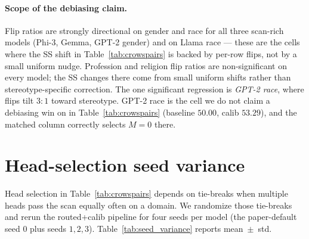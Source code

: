 \paragraph{Scope of the debiasing claim.} Flip ratios are strongly
directional on gender and race for all three scan-rich models
(Phi-3, Gemma, GPT-2 gender) and on Llama race --- these are the
cells where the SS shift in Table~\ref{tab:crowspairs} is backed by
per-row flips, not by a small uniform nudge. Profession and religion
flip ratios are non-significant on every model; the SS changes there
come from small uniform shifts rather than stereotype-specific
correction. The one significant regression is \emph{GPT-2 race},
where flips tilt $3{:}1$ toward stereotype. GPT-2 race is the cell we
do not claim a debiasing win on in Table~\ref{tab:crowspairs} (baseline
$50.00$, calib $53.29$), and the matched column correctly selects
$M{=}0$ there.

\section{Head-selection seed variance}
\label{app:seed_variance}

Head selection in Table~\ref{tab:crowspairs} depends on tie-breaks
when multiple heads pass the scan equally often on a domain. We
randomize those tie-breaks and rerun the routed+calib pipeline for
four seeds per model (the paper-default seed $0$ plus seeds $1,2,3$).
Table~\ref{tab:seed_variance} reports mean~$\pm$~std.

